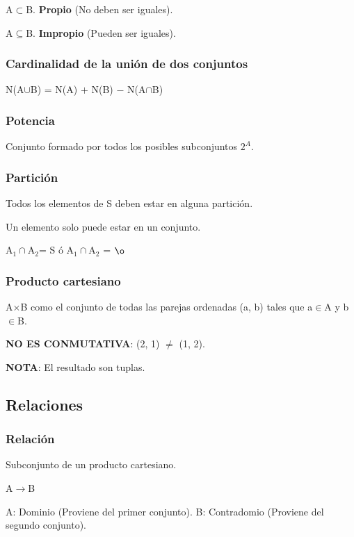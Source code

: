 \documentclass{article}
\begin{document}
A$\subset$B. \textbf{Propio} (No deben ser iguales).

A$\subseteq$B. \textbf{Impropio} (Pueden ser iguales).

\subsubsection{Cardinalidad de la unión de dos conjuntos}

N(A$\cup$B) = N(A) $+$ N(B) $-$ N(A$\cap$B)

\subsubsection{Potencia}

Conjunto formado por todos los posibles subconjuntos $2^A$.

\subsubsection{Partición}

Todos los elementos de S deben estar en alguna partición.

Un elemento solo puede estar en un conjunto.
\vspace{1em}

A$_1\cap$A$_2$= S ó A$_1\cap$A$_2$ = $\o$

\subsubsection{Producto cartesiano}

A$\times$B como el conjunto de todas las parejas ordenadas (a, b) tales que
a$\in$A y b$\in$B.

\textbf{NO ES CONMUTATIVA}: (2, 1) $\neq$ (1, 2).

\textbf{NOTA}: El resultado son tuplas.

\subsection{Relaciones}

\subsubsection{Relación}

Subconjunto de un producto cartesiano.

A$\rightarrow$B

A: Dominio (Proviene del primer conjunto).
B: Contradomio (Proviene del segundo conjunto).
\end{document}
